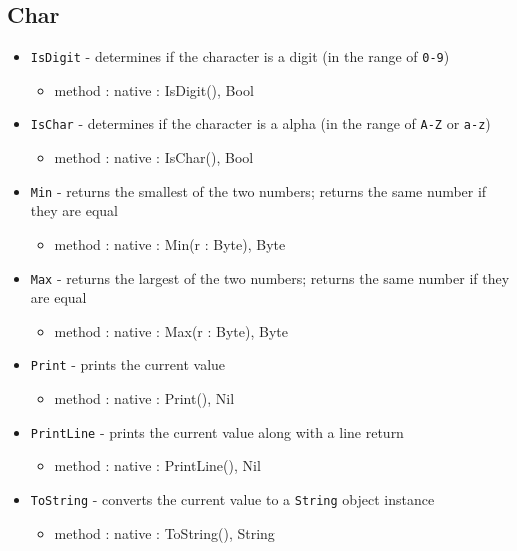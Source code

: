 \documentclass[12pt]{article}
\begin{document}
\subsection{Char}
\begin{itemize}
    \item \texttt{IsDigit} - determines if the character is a digit (in the range of \texttt{0-9})
    	\begin{itemize}
	\item method : native : IsDigit(), Bool
	\end{itemize}
    \item \texttt{IsChar} - determines if the character is a alpha (in the range of \texttt{A-Z} or \texttt{a-z})
    	\begin{itemize}
	\item method : native : IsChar(), Bool
	\end{itemize}
    \item \texttt{Min} - returns the smallest of the two numbers; returns the same number if they are equal
    	\begin{itemize}
	\item method : native : Min(r : Byte), Byte
	\end{itemize}
    \item \texttt{Max} - returns the largest of the two numbers; returns the same number if they are equal
    	\begin{itemize}
	\item method : native : Max(r : Byte), Byte
	\end{itemize}
    \item \texttt{Print} - prints the current value
    	\begin{itemize}
	\item method : native : Print(), Nil
	\end{itemize}
    \item \texttt{PrintLine} - prints the current value along with a line return
    	\begin{itemize}
	\item method : native : PrintLine(), Nil
	\end{itemize}
    \item \texttt{ToString} - converts the current value to a \texttt{String} object instance
   	\begin{itemize}
	\item method : native : ToString(), String
	\end{itemize}
\end{itemize}
\end{document}
